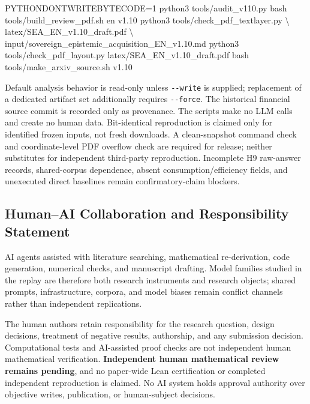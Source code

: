 \documentclass[
  11pt]{article}
\newenvironment{Shaded}{}{}
\newcommand{\DataTypeTok}[1]{\textcolor[rgb]{0.56,0.13,0.00}{#1}}
\newcommand{\ExtensionTok}[1]{#1}
\newcommand{\FunctionTok}[1]{\textcolor[rgb]{0.02,0.16,0.49}{#1}}
\newcommand{\NormalTok}[1]{#1}
\newcommand{\OperatorTok}[1]{\textcolor[rgb]{0.40,0.40,0.40}{#1}}
\newcommand{\VariableTok}[1]{\textcolor[rgb]{0.10,0.09,0.49}{#1}}
\begin{document}
\begin{Shaded}
\begin{Highlighting}[]
\VariableTok{PYTHONDONTWRITEBYTECODE}\OperatorTok{=}\NormalTok{1 }\ExtensionTok{python3}\NormalTok{ tools/audit\_v110.py}
\FunctionTok{bash}\NormalTok{ tools/build\_review\_pdf.sh en v1.10}
\ExtensionTok{python3}\NormalTok{ tools/check\_pdf\_textlayer.py }\DataTypeTok{\textbackslash{}}
\NormalTok{  latex/SEA\_EN\_v1.10\_draft.pdf }\DataTypeTok{\textbackslash{}}
\NormalTok{  input/sovereign\_epistemic\_acquisition\_EN\_v1.10.md}
\ExtensionTok{python3}\NormalTok{ tools/check\_pdf\_layout.py latex/SEA\_EN\_v1.10\_draft.pdf}
\FunctionTok{bash}\NormalTok{ tools/make\_arxiv\_source.sh v1.10}
\end{Highlighting}
\end{Shaded}

Default analysis behavior is read-only unless \texttt{-\/-write} is
supplied; replacement of a dedicated artifact set additionally requires
\texttt{-\/-force}. The historical financial source commit is recorded
only as provenance. The scripts make no LLM calls and create no human
data. Bit-identical reproduction is claimed only for identified frozen
inputs, not fresh downloads. A clean-snapshot command check and
coordinate-level PDF overflow check are required for release; neither
substitutes for independent third-party reproduction. Incomplete H9
raw-answer records, shared-corpus dependence, absent
consumption/efficiency fields, and unexecuted direct baselines remain
confirmatory-claim blockers.

\subsection{Human--AI Collaboration and Responsibility
Statement}\label{humanai-collaboration-and-responsibility-statement}

AI agents assisted with literature searching, mathematical
re-derivation, code generation, numerical checks, and manuscript
drafting. Model families studied in the replay are therefore both
research instruments and research objects; shared prompts,
infrastructure, corpora, and model biases remain conflict channels
rather than independent replications.

The human authors retain responsibility for the research question,
design decisions, treatment of negative results, authorship, and any
submission decision. Computational tests and AI-assisted proof checks
are not independent human mathematical verification. \textbf{Independent
human mathematical review remains pending}, and no paper-wide Lean
certification or completed independent reproduction is claimed. No AI
system holds approval authority over objective writes, publication, or
human-subject decisions.
\end{document}

